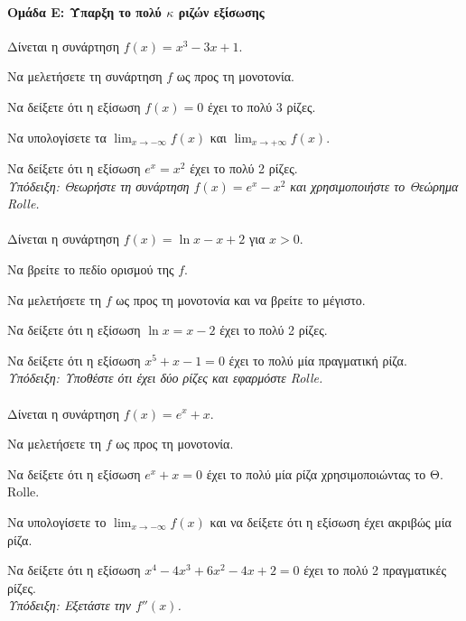 \documentclass[11pt,a4paper,modern]{FFExercises}
\begin{document}
\paragraph{Ομάδα Ε: Ύπαρξη το πολύ $\kappa$ ριζών εξίσωσης}

\askhsh
Δίνεται η συνάρτηση $f(x) = x^3 - 3x + 1$.
\begin{alist}
  \item Να μελετήσετε τη συνάρτηση $f$ ως προς τη μονοτονία.
  \item Να δείξετε ότι η εξίσωση $f(x) = 0$ έχει το πολύ 3 ρίζες.
  \item Να υπολογίσετε τα $\displaystyle\lim_{x \to -\infty} f(x)$ και $\displaystyle\lim_{x \to +\infty} f(x)$.
\end{alist}

\askhsh
Να δείξετε ότι η εξίσωση $e^x = x^2$ έχει το πολύ 2 ρίζες.\\
\textit{Υπόδειξη: Θεωρήστε τη συνάρτηση $f(x) = e^x - x^2$ και χρησιμοποιήστε το Θεώρημα Rolle.}\\\\

\askhsh
Δίνεται η συνάρτηση $f(x) = \ln x - x + 2$ για $x > 0$.
\begin{alist}
  \item Να βρείτε το πεδίο ορισμού της $f$.
  \item Να μελετήσετε τη $f$ ως προς τη μονοτονία και να βρείτε το μέγιστο.
  \item Να δείξετε ότι η εξίσωση $\ln x = x - 2$ έχει το πολύ 2 ρίζες.
\end{alist}

\askhsh
Να δείξετε ότι η εξίσωση $x^5 + x - 1 = 0$ έχει το πολύ μία πραγματική ρίζα.\\
\textit{Υπόδειξη: Υποθέστε ότι έχει δύο ρίζες και εφαρμόστε Rolle.}\\\\

\askhsh
Δίνεται η συνάρτηση $f(x) = e^x + x$.
\begin{alist}
  \item Να μελετήσετε τη $f$ ως προς τη μονοτονία.
  \item Να δείξετε ότι η εξίσωση $e^x + x = 0$ έχει το πολύ μία ρίζα χρησιμοποιώντας το Θ. Rolle.
  \item Να υπολογίσετε το $\displaystyle\lim_{x \to -\infty} f(x)$ και να δείξετε ότι η εξίσωση έχει ακριβώς μία ρίζα.
\end{alist}

\askhsh
Να δείξετε ότι η εξίσωση $x^4 - 4x^3 + 6x^2 - 4x + 2 = 0$ έχει το πολύ 2 πραγματικές ρίζες.\\
\textit{Υπόδειξη: Εξετάστε την $f''(x)$.}\\\\
\end{document}
